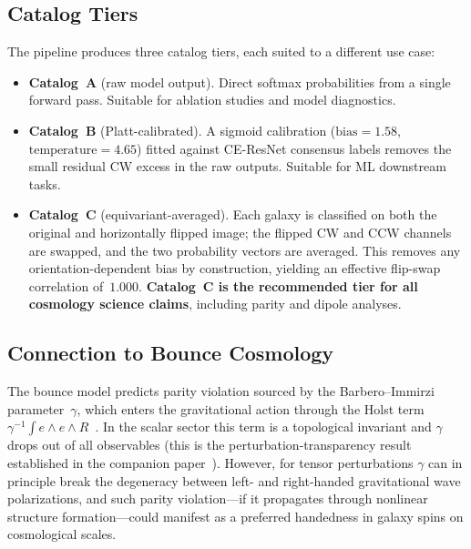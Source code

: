 \subsection{Catalog Tiers}
\label{sec:chirality_tiers}

The pipeline produces three catalog tiers, each suited to a different
use case:

\begin{itemize}
\item \textbf{Catalog~A} (raw model output).  Direct softmax
  probabilities from a single forward pass.  Suitable for ablation
  studies and model diagnostics.

\item \textbf{Catalog~B} (Platt-calibrated).  A sigmoid calibration
  ($\text{bias} = 1.58$, $\text{temperature} = 4.65$) fitted against
  CE-ResNet consensus labels removes the small residual CW excess in
  the raw outputs.  Suitable for ML downstream tasks.

\item \textbf{Catalog~C} (equivariant-averaged).  Each galaxy is
  classified on both the original and horizontally flipped image; the
  flipped CW and CCW channels are swapped, and the two probability
  vectors are averaged.  This removes any orientation-dependent bias by
  construction, yielding an effective flip-swap correlation of~$1.000$.
  \textbf{Catalog~C is the recommended tier for all cosmology science
  claims}, including parity and dipole analyses.
\end{itemize}

\subsection{Connection to Bounce Cosmology}
\label{sec:chirality_motivation}

The bounce model predicts parity violation sourced by the
Barbero--Immirzi parameter~$\gamma$, which enters the gravitational
action through the Holst term $\gamma^{-1}\int e \wedge e \wedge
R$~\citep{Holst:1995pc}.  In the scalar sector this term is a
topological invariant and $\gamma$ drops out of all observables (this is
the perturbation-transparency result established in the companion
paper~\citep{Golden:2026framework}).  However, for tensor perturbations
$\gamma$ can in principle break the degeneracy between left- and
right-handed gravitational wave polarizations, and such parity
violation---if it propagates through nonlinear structure formation---could
manifest as a preferred handedness in galaxy spins on cosmological
scales.

